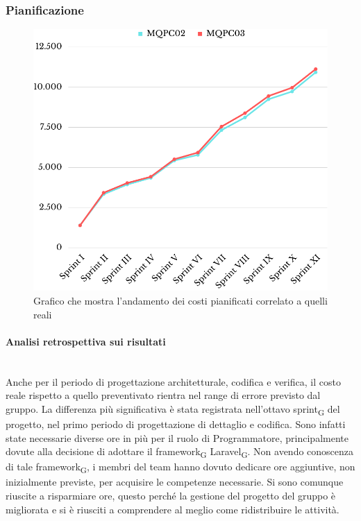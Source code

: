 \subsubsection{Pianificazione}
\begin{figure}[H]
	\centering
	\includegraphics[scale=0.5]{img/BCWS-ACWS2.png}
	\caption{Grafico che mostra l'andamento dei costi pianificati correlato a quelli reali}
\end{figure}
\paragraph{Analisi retrospettiva sui risultati}\mbox{}\\
Anche per il periodo di progettazione architetturale, codifica e verifica, il costo reale rispetto a quello preventivato rientra nel range di errore previsto dal gruppo. 
La differenza più significativa è stata registrata nell'ottavo sprint\textsubscript{G} del progetto, nel primo periodo di progettazione di dettaglio e codifica. Sono infatti state necessarie diverse ore in più per il ruolo di Programmatore, principalmente dovute alla decisione di adottare il framework\textsubscript{G} Laravel\textsubscript{G}. Non avendo conoscenza di tale framework\textsubscript{G}, i membri del team hanno dovuto dedicare ore aggiuntive, non inizialmente previste, per
acquisire le competenze necessarie.
Si sono comunque riuscite a risparmiare ore, questo perché la gestione del progetto del gruppo è migliorata e si è riusciti a comprendere al meglio come ridistribuire le attività. 

